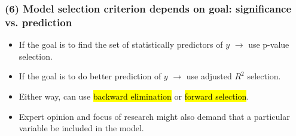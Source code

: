 \documentclass[slidestop,compress,mathserif,12pt,t,professionalfonts,xcolor=table]{beamer}
\begin{document}
\begin{frame}
\frametitle{(6) Model selection criterion depends on goal: significance vs. prediction}

\begin{itemize}

\item If the goal is to find the set of statistically predictors of $y$ $\rightarrow$ use p-value selection.

\pause

\item If the goal is to do better prediction of $y$ $\rightarrow$ use adjusted $R^2$ selection.

\pause

\item Either way, can use \hl{backward elimination} or \hl{forward selection}.

\pause

\item Expert opinion and focus of research might also demand that a particular variable be included in the model.

\end{itemize}

\end{frame}

\end{document}
